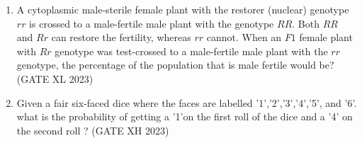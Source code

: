 \begin{enumerate}[label=\thechapter.\arabic*,ref=\thechapter.\theenumi]
\item A cytoplasmic male-sterile female plant with the restorer (nuclear) genotype $rr$ is crossed to a male-fertile male plant with the genotype $RR$. Both $RR$ and $Rr$ can restore the fertility, whereas $rr$ cannot. When an $F1$ female plant with $Rr$ genotype was test-crossed to a male-fertile male plant with the $rr$ genotype, the percentage of the population that is male fertile would be?
\hfill (GATE XL 2023)\\

\item Given a fair six-faced dice where the faces are labelled '1','2','3','4','5', and '6'. what is the probability of getting a '1'on the first roll of the dice and a '4' on the second roll ?
\hfill (GATE XH 2023)\\
\solution

\end{enumerate}
